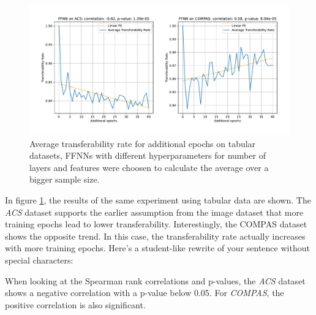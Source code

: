 \documentclass{article}
\begin{document}
\begin{figure}[h]
    \centering 
    \includegraphics[width=\linewidth]{abb/epoch_evaluation_tabular.pdf}
    
    \caption{Average transferability rate for additional epochs on tabular datasets, FFNNs with different hyperparameters for number of layers and features were choosen to calculate the average over a bigger sample size.}
    \label{fig:add_epochs_tabular}
\end{figure}
\noindent
In figure \ref{fig:add_epochs_tabular}, the results of the same experiment using tabular data are shown. The \textit{ACS} dataset supports the earlier assumption from the image dataset that more training epochs lead to lower transferability. Interestingly, the COMPAS dataset shows the opposite trend. In this case, the transferability rate actually increases with more training epochs. Here’s a student-like rewrite of your sentence without special characters:

When looking at the Spearman rank correlations and p-values, the \textit{ACS} dataset shows a negative correlation with a p-value below 0.05. For \textit{COMPAS}, the positive correlation is also significant.\\
\end{document}
